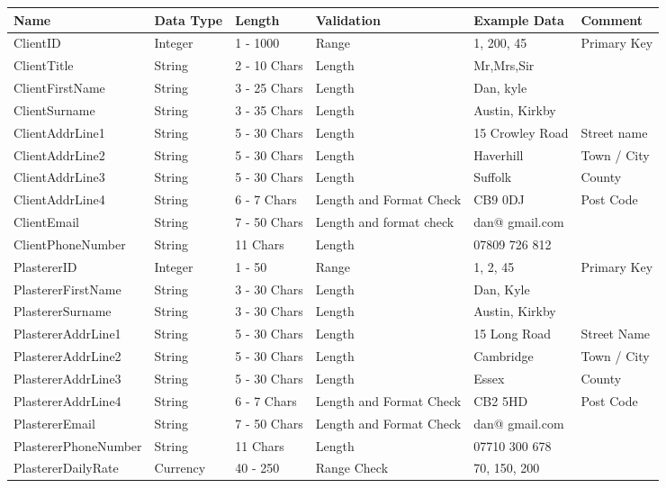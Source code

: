 \begin{flushleft}
\begin{longtable}{|p{3.6cm}|p{1.5cm}|p{2cm}|p{2cm}|p{2cm}|p{2cm}|}
\hline
\textbf{Name} & \textbf{Data Type} & \textbf{Length} & \textbf{Validation} & \textbf{Example Data} & \textbf{Comment} \\ \hline



ClientID & Integer & 1 - 1000 & Range & 1, 200, 45 & Primary Key \\ \hline
ClientTitle & String & 2 - 10 Chars & Length & Mr,Mrs,Sir &  \\ \hline 
ClientFirstName & String & 3 - 25 Chars & Length & Dan, kyle &  \\ \hline 
ClientSurname & String & 3 - 35 Chars & Length & Austin, Kirkby &  \\ \hline 
ClientAddrLine1 & String & 5 - 30 Chars & Length & 15 Crowley Road &  Street name \\ \hline 
ClientAddrLine2 & String & 5 - 30 Chars & Length & Haverhill & Town / City \\ \hline 
ClientAddrLine3 & String & 5 - 30 Chars & Length & Suffolk & County  \\ \hline 
ClientAddrLine4 & String & 6 - 7 Chars & Length and Format Check & CB9 0DJ & Post Code\\ \hline 
ClientEmail & String & 7 - 50 Chars & Length and format check & dan@ gmail.com &  \\ \hline 
ClientPhoneNumber & String & 11 Chars & Length & 07809 726 812 &  \\ \hline \hline



PlastererID & Integer & 1 - 50  & Range  & 1, 2, 45 & Primary Key \\ \hline
PlastererFirstName & String & 3 - 30 Chars & Length & Dan, Kyle & \\ \hline
PlastererSurname & String & 3 - 30 Chars & Length & Austin, Kirkby & \\ \hline
PlastererAddrLine1 & String & 5 - 30 Chars & Length & 15 Long Road & Street Name \\ \hline
PlastererAddrLine2 & String & 5 - 30 Chars & Length & Cambridge & Town / City \\ \hline
PlastererAddrLine3 & String & 5 - 30 Chars & Length & Essex & County \\ \hline
PlastererAddrLine4 & String & 6 - 7 Chars & Length and Format Check & CB2 5HD & Post Code \\ \hline
PlastererEmail & String & 7 - 50 Chars & Length and Format Check & dan@ gmail.com  &  \\ \hline
PlastererPhoneNumber & String & 11 Chars & Length & 07710 300 678 & \\ \hline
PlastererDailyRate & Currency & 40 - 250 & Range Check & 70, 150, 200 & \\ \hline \hline




\end{longtable}
\end{flushleft}
